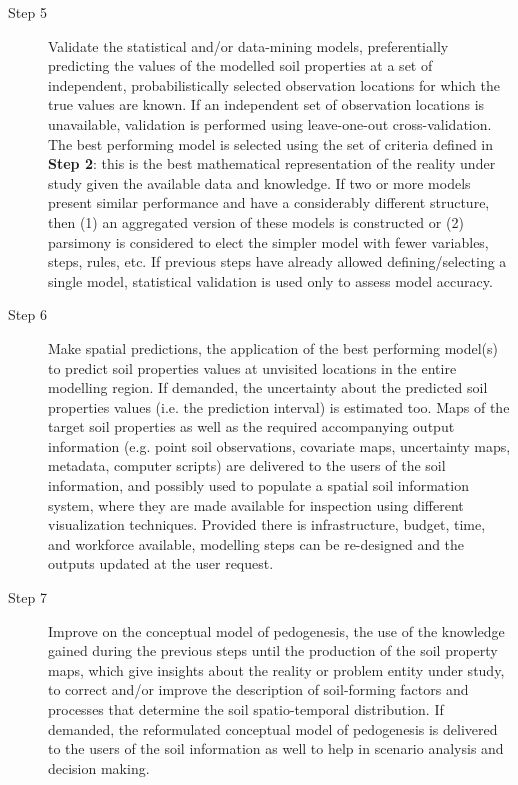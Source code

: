 \begin{description}
\item[Step 5] Validate the statistical and/or data-mining models, preferentially predicting the values of the 
modelled soil properties at a set of independent, probabilistically selected observation locations for which 
the true values are known. If an independent set of observation locations is unavailable, validation is 
performed using leave-one-out cross-validation. The best performing model is selected using the set of criteria
defined in \textbf{Step 2}: this is the best mathematical representation of the reality under study given the 
available data and knowledge. If two or more models present similar performance and have a considerably 
different structure, then (1) an aggregated version of these models is constructed or (2) parsimony is 
considered to elect the simpler model with fewer variables, steps, rules, etc. If previous steps have already 
allowed defining/selecting a single model, statistical validation is used only to assess model accuracy.

\item[Step 6] Make spatial predictions, the application of the best performing model(s) to predict soil 
properties values at unvisited locations in the entire modelling region. If demanded, the uncertainty about 
the predicted soil properties values (i.e. the prediction interval) is estimated too. Maps of the target soil 
properties as well as the required accompanying output information (e.g. point soil observations, covariate 
maps, uncertainty maps, metadata, computer scripts) are delivered to the users of the soil information, and 
possibly used to populate a spatial soil information system, where they are made available for inspection 
using different visualization techniques. Provided there is infrastructure, budget, time, and workforce 
available, modelling steps can be re-designed and the outputs updated at the user request.

\item[Step 7] Improve on the conceptual model of pedogenesis, the use of the knowledge gained during the 
previous steps until the production of the soil property maps, which give insights about the reality or problem
entity under study, to correct and/or improve the description of soil-forming factors and processes that 
determine the soil spatio-temporal distribution. If demanded, the reformulated conceptual model of pedogenesis 
is delivered to the users of the soil information as well to help in scenario analysis and decision making.
\end{description}

